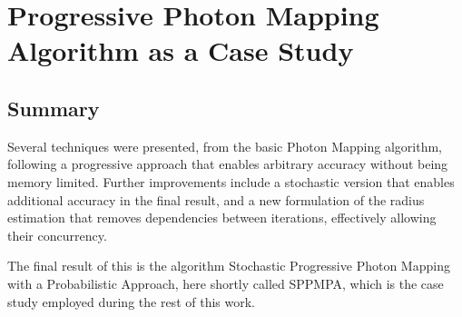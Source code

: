\documentclass[main.tex]{subfiles}
\begin{document}
\chapter{Progressive Photon Mapping Algorithm as a Case Study} \label{chapter:case_study}







\section{Summary}

Several techniques were presented, from the basic Photon Mapping algorithm, following a progressive approach that enables arbitrary accuracy without being memory limited. Further improvements include a stochastic version that enables additional accuracy in the final result, and a new formulation of the radius estimation that removes dependencies between iterations, effectively allowing their concurrency.

The final result of this is the algorithm Stochastic Progressive Photon Mapping with a Probabilistic Approach, here shortly called SPPMPA, which is the case study employed during the rest of this work.
\end{document}
